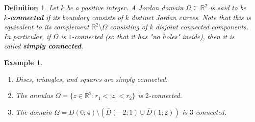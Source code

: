 \documentclass[10pt]{article}
\newcommand{\R}{\mathbb{R}}
\theoremstyle{newstyle}
\newtheorem{defn}[thm]{Definition}
\newtheorem{exmp}[thm]{Example}
\begin{document}
\begin{defn}
Let $k$ be a positive integer. A Jordan domain $\Omega \subseteq \R^2$ is said to be 
{\bf $k$-connected} if its boundary consists of $k$ distinct Jordan curves. 
Note that this is equivalent to its complement $\R^2 \setminus \Omega$ consisting of $k$ 
disjoint connected components. In particular, if $\Omega$ is $1$-connected (so that 
it has "no holes" inside), then it is called {\bf simply connected}.
\end{defn}

\begin{exmp}~
\begin{enumerate}[(1)]
    \item Discs, triangles, and squares are simply connected.
    \item The annulus $\Omega = \{z \in \R^2 : r_1 < |z| < r_2\}$ is $2$-connected.
    \item The domain $\Omega = D(0; 4) \setminus (\overline{D}(-2; 1) \cup \overline{D}(1; 2))$ 
    is $3$-connected.
\end{enumerate}
\end{exmp}
\end{document}
